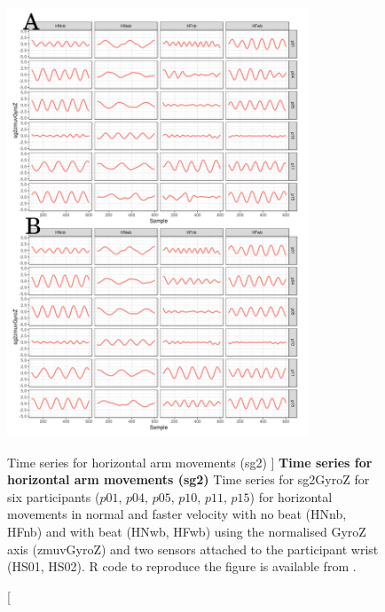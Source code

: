 \begin{figure}
\centering
\includegraphics[width=0.8\textwidth]{tssg2gyroZ}
    	\caption
	[Time series for horizontal arm movements (sg2) ]{
	{\bf Time series for horizontal arm movements (sg2)}
		Time series for sg2GyroZ for six participants 
		($p01$, $p04$, $p05$, $p10$, $p11$, $p15$) 
		for horizontal movements in normal and faster velocity with
		no beat	(HNnb, HFnb) and with beat (HNwb, HFwb) using 
		the normalised GyroZ axis (zmuvGyroZ) and 
		two sensors attached to the participant wrist (HS01, HS02).
	R code to reproduce the figure is available from \cite{xochicale2018}.
        }
    \label{fig:tssg2gyroZ-hii}
\end{figure}




